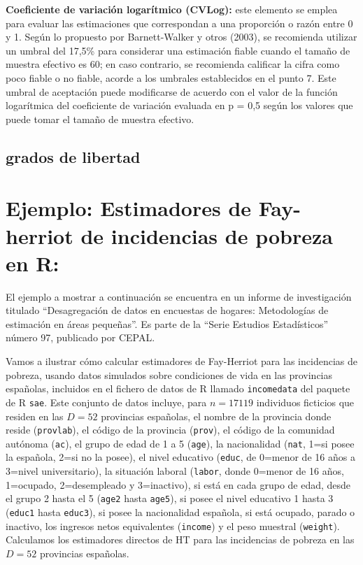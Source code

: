 \documentclass[12pt,spanish]{article}
\begin{document}
\textbf{Coeficiente de variación logarítmico (CVLog):} este elemento se emplea para evaluar las estimaciones que correspondan a una proporción o razón entre 0 y 1. Según lo propuesto por Barnett-Walker y otros (2003), se recomienda utilizar un umbral del 17,5\% para considerar una estimación fiable cuando el tamaño de muestra efectivo es 60; en caso contrario, se recomienda calificar la cifra como poco fiable o no fiable, acorde a los umbrales establecidos en el punto 
7. Este umbral de aceptación puede modificarse de acuerdo con el valor de la función logarítmica del coeficiente de variación evaluada en p = 0,5 según los valores que puede tomar el tamaño de muestra efectivo.


\subsection*{grados de libertad}
\newpage
\section*{Ejemplo: Estimadores de Fay-herriot de incidencias de pobreza en R:}

El ejemplo a mostrar a continuación se encuentra en un informe de investigación titulado “Desagregación de datos en encuestas de hogares: Metodologías de estimación en áreas pequeñas”. Es parte de la “Serie Estudios Estadísticos” número 97, publicado por CEPAL.

Vamos a ilustrar cómo calcular estimadores de Fay-Herriot para las incidencias de pobreza, usando datos simulados sobre condiciones de vida en las provincias españolas, incluidos en el fichero de datos de R llamado \texttt{incomedata} del paquete de R \texttt{sae}. Este conjunto de datos incluye, para $n = 17119$ individuos ficticios que residen en las $D = 52$ provincias españolas, el nombre de la provincia donde reside (\texttt{provlab}), el código de la provincia (\texttt{prov}), el código de la comunidad autónoma (\texttt{ac}), el grupo de edad de 1 a 5 (\texttt{age}), la nacionalidad (\texttt{nat}, 1=si posee la española, 2=si no la posee), el nivel educativo (\texttt{educ}, de 0=menor de 16 años a 3=nivel universitario), la situación laboral (\texttt{labor}, donde 0=menor de 16 años, 1=ocupado, 2=desempleado y 3=inactivo), si está en cada grupo de edad, desde el grupo 2 hasta el 5 (\texttt{age2} hasta \texttt{age5}), si posee el nivel educativo 1 hasta 3 (\texttt{educ1} hasta \texttt{educ3}), si posee la nacionalidad española, si está ocupado, parado o inactivo, los ingresos netos equivalentes (\texttt{income}) y el peso muestral (\texttt{weight}). Calculamos los estimadores directos de HT para las incidencias de pobreza en las $D=52$ provincias españolas.
\end{document}

